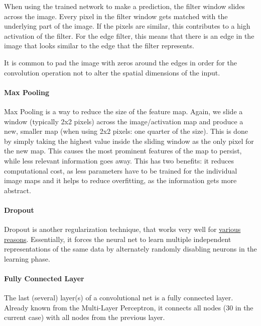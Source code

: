 \documentclass[]{article}
\let\oldparagraph\paragraph
\renewcommand{\paragraph}[1]{\oldparagraph{#1}\mbox{}}
\begin{document}
When using the trained network to make a prediction, the filter window
slides across the image. Every pixel in the filter window gets matched
with the underlying part of the image. If the pixels are similar, this
contributes to a high activation of the filter. For the edge filter,
this means that there is an edge in the image that looks similar to the
edge that the filter represents.

It is common to pad the image with zeros around the edges in order for
the convolution operation not to alter the spatial dimensions of the
input.

\paragraph{Max Pooling}\label{max-pooling}

Max Pooling is a way to reduce the size of the feature map. Again, we
slide a window (typically 2x2 pixels) across the image/activation map
and produce a new, smaller map (when using 2x2 pixels: one quarter of
the size). This is done by simply taking the highest value inside the
sliding window as the only pixel for the new map. This causes the most
prominent features of the map to persist, while less relevant
information goes away. This has two benefits: it reduces computational
cost, as less parameters have to be trained for the individual image
maps and it helps to reduce overfitting, as the information gets more
abstract.

\paragraph{Dropout}\label{dropout}

Dropout is another regularization technique, that works very well for
\href{http://neuralnetworksanddeeplearning.com/chap3.html}{various
reasons}. Essentially, it forces the neural net to learn multiple
independent representations of the same data by alternately randomly
disabling neurons in the learning phase.

\paragraph{Fully Connected Layer}\label{fully-connected-layer}

The last (several) layer(s) of a convolutional net is a fully connected
layer. Already known from the Multi-Layer Perceptron, it connects all
nodes (30 in the current case) with all nodes from the previous layer.
\end{document}
